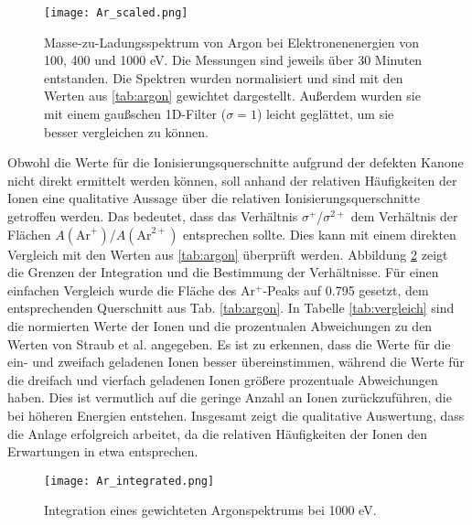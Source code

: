 \begin{landscape}
    \begin{figure}
        \centering
        \hspace*{-3cm}\texttt{[image: Ar\_scaled.png]}
        \caption[Skaliertes Massenspektrum von Argon bei verschiedenen Elektronenenergien]{Masse-zu-Ladungsspektrum von Argon bei Elektronenenergien von 100, 400 und 1000 eV. Die Messungen sind jeweils über 30 Minuten entstanden. Die Spektren wurden normalisiert und sind mit den Werten aus \ref{tab:argon} gewichtet dargestellt. Außerdem wurden sie mit einem gaußschen 1D-Filter ($\sigma = 1$) leicht geglättet, um sie besser vergleichen zu können.}
        \label{fig:ar_scaled}
    \end{figure}
\end{landscape}

Obwohl die Werte für die Ionisierungsquerschnitte aufgrund der defekten Kanone nicht direkt ermittelt werden können, soll anhand der relativen Häufigkeiten der Ionen eine qualitative Aussage über die relativen Ionisierungsquerschnitte getroffen werden. Das bedeutet, dass das Verhältnis $\sigma^+$/$\sigma^{2+}$ dem Verhältnis der Flächen $A(\text{Ar}^+)$/$A(\text{Ar}^{2+})$ entsprechen sollte. Dies kann mit einem direkten Vergleich  mit den Werten aus \ref{tab:argon} überprüft werden. Abbildung \ref{fig:ar_ratio} zeigt die Grenzen der Integration und die Bestimmung der Verhältnisse. Für einen einfachen Vergleich wurde die Fläche des Ar$^+$-Peaks auf 0.795 gesetzt, dem entsprechenden Querschnitt aus Tab. \ref{tab:argon}. In Tabelle \ref{tab:vergleich} sind die normierten Werte der Ionen und die prozentualen Abweichungen zu den Werten von Straub et al. \cite{Straub} angegeben. Es ist zu erkennen, dass die Werte für die ein- und zweifach geladenen Ionen besser übereinstimmen, während die Werte für die dreifach und vierfach geladenen Ionen größere prozentuale Abweichungen haben. Dies ist vermutlich auf die geringe Anzahl an Ionen zurückzuführen, die bei höheren Energien entstehen. Insgesamt zeigt die qualitative Auswertung, dass die Anlage erfolgreich arbeitet, da die relativen Häufigkeiten der Ionen den Erwartungen in etwa entsprechen. 

\begin{figure}
    \hspace{-1.1cm}\texttt{[image: Ar\_integrated.png]}
    \caption[Integration eines gewichteten Argonspektrums bei 1000 eV]{Integration eines gewichteten Argonspektrums bei 1000 eV.}
    \label{fig:ar_ratio}
\end{figure}

